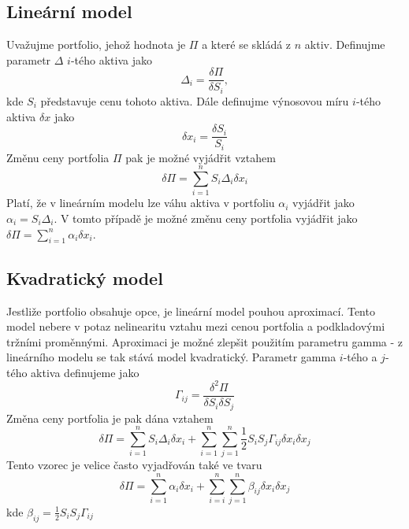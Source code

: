 \documentclass[a4paper]{book}
\begin{document}
\subsection{Lineární model}

Uvažujme portfolio, jehož hodnota je $\Pi$ a které se skládá z $n$ aktiv. Definujme parametr $\Delta$ $i$-tého aktiva jako
\begin{equation*}
\Delta_i = \frac{\delta \Pi}{\delta S_i},
\end{equation*}
kde $S_i$ představuje cenu tohoto aktiva. Dále definujme výnosovou míru $i$-tého aktiva $\delta x$ jako
\begin{equation*}
\delta x_i = \frac{\delta S_i}{S_i}
\end{equation*}
Změnu ceny portfolia $\Pi$ pak je možné vyjádřit vztahem
\begin{equation*}
\delta \Pi = \sum_{i=1}^n S_i \Delta_i \delta x_i
\end{equation*}
Platí, že v lineárním modelu lze váhu aktiva v portfoliu $\alpha_i$ vyjádřit jako $\alpha_i = S_i \Delta_i$. V tomto případě je možné změnu ceny portfolia vyjádřit jako $\delta \Pi = \sum_{i=1}^n \alpha_i \delta x_i$.

\subsection{Kvadratický model}

Jestliže portfolio obsahuje opce, je lineární model pouhou aproximací. Tento model nebere v potaz nelinearitu vztahu mezi cenou portfolia a podkladovými tržními proměnnými. Aproximaci je možné zlepšit použitím parametru gamma - z lineárního modelu se tak stává model kvadratický. Parametr gamma $i$-tého a $j$-tého aktiva definujeme jako
\begin{equation*}
\Gamma_{ij} = \frac{\delta^2 \Pi}{\delta S_i \delta S_j}
\end{equation*}
Změna ceny portfolia je pak dána vztahem
\begin{equation*}
\delta \Pi = \sum_{i=1}^n S_i \Delta_i \delta x_i + \sum_{i=1}^n \sum_{j=1}^n \frac{1}{2}S_i S_j \Gamma_{ij} \delta x_i \delta x_j
\end{equation*}
Tento vzorec je velice často vyjadřován také ve tvaru
\begin{equation}
\delta \Pi = \sum_{i=1}^n \alpha_i \delta x_i + \sum_{i=i}^n \sum_{j=1}^n \beta_{ij} \delta x_i \delta x_j
\end{equation}
kde $\beta_{ij}=\frac{1}{2}S_i S_j \Gamma_{ij}$
\end{document}
